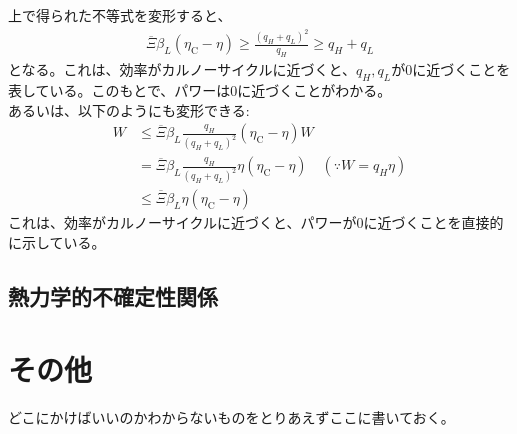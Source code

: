 \documentclass[a4paper,11pt]{jsarticle}
\numberwithin{equation}{section}
\begin{document}
上で得られた不等式を変形すると、
\begin{align}
  \overline{\Xi} \beta_L(\eta_{\text{C}} - \eta) \geq \frac{(q_H + q_L)^2}{q_H} \geq q_H + q_L
\end{align}
となる。これは、効率がカルノーサイクルに近づくと、$q_H, q_L$が0に近づくことを表している。このもとで、パワーは0に近づくことがわかる。\\
あるいは、以下のようにも変形できる:
\begin{align}
  W &\leq \overline{\Xi} \beta_L\frac{q_H}{(q_H + q_L)^2}(\eta_{\text{C}} - \eta)W\\
  &= \overline{\Xi} \beta_L\frac{q_H}{(q_H + q_L)^2}\eta(\eta_{\text{C}} - \eta)\quad (\because W = q_H \eta)\\
    &\leq \overline{\Xi} \beta_L\eta(\eta_{\text{C}} - \eta)
\end{align}
これは、効率がカルノーサイクルに近づくと、パワーが0に近づくことを直接的に示している。\\

\subsection{熱力学的不確定性関係}

\section{その他}
どこにかけばいいのかわからないものをとりあえずここに書いておく。\\
\end{document}
